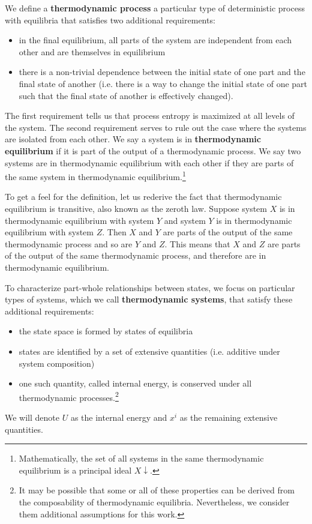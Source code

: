 \documentclass[letterpaper,twocolumn]{article}
\begin{document}
We define a \textbf{thermodynamic process} a particular type of deterministic process with equilibria that satisfies two additional requirements:
\begin{itemize}
	\item in the final equilibrium, all parts of the system are independent from each other and are themselves in equilibrium
	\item there is a non-trivial dependence between the initial state of one part and the final state of another (i.e. there is a way to change the initial state of one part such that the final state of another is effectively changed).
\end{itemize}
The first requirement tells us that process entropy is maximized at all levels of the system. The second requirement serves to rule out the case where the systems are isolated from each other. We say a system is in \textbf{thermodynamic equilibrium} if it is part of the output of a thermodynamic process. We say two systems are in thermodynamic equilibrium with each other if they are parts of the same system in thermodynamic equilibrium.\footnote{Mathematically, the set of all systems in the same thermodynamic equilibrium is a principal ideal $X\!\! \downarrow$.}

To get a feel for the definition, let us rederive the fact that thermodynamic equilibrium is transitive, also known as the zeroth law. Suppose system $X$ is in thermodynamic equilibrium with system $Y$ and system $Y$ is in thermodynamic equilibrium with system $Z$. Then $X$ and $Y$ are parts of the output of the same thermodynamic process and so are $Y$ and $Z$. This means that $X$ and $Z$ are parts of the output of the same thermodynamic process, and therefore are in thermodynamic equilibrium.

To characterize part-whole relationships between states, we focus on particular types of systems, which we call \textbf{thermodynamic systems}, that satisfy these additional requirements: 
\begin{itemize}
	\item the state space is formed by states of equilibria
	\item states are identified by a set of extensive quantities (i.e. additive under system composition)
	\item one such quantity, called internal energy, is conserved under all thermodynamic processes.\footnote{It may be possible that some or all of these properties can be derived from the composability of thermodynamic equilibria. Nevertheless, we consider them additional assumptions for this work.
	}
\end{itemize}
We will denote $U$ as the internal energy and $x^i$ as the remaining extensive quantities.
\end{document}
